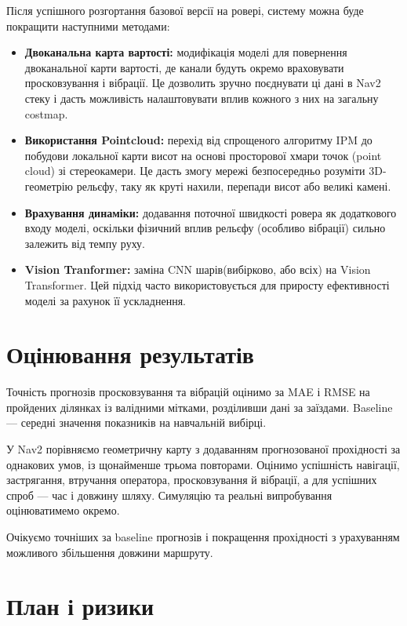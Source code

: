 \documentclass[ukrainian]{ucuproposal}
\begin{document}
Після успішного розгортання базової версії на ровері, систему можна буде покращити наступними методами:
\begin{itemize}
	\item \textbf{Двоканальна карта вартості:} модифікація моделі для повернення двоканальної карти вартості, де канали будуть окремо враховувати просковзування і вібрації. Це дозволить зручно поєднувати ці дані в Nav2 стеку і дасть можливість налаштовувати вплив кожного з них на загальну costmap.
	\item \textbf{Використання Pointcloud:} перехід від спрощеного алгоритму IPM до побудови локальної карти висот на основі просторової хмари точок (point cloud) зі стереокамери. Це дасть змогу мережі безпосередньо розуміти 3D-геометрію рельєфу, таку як круті нахили, перепади висот або великі камені.
	\item \textbf{Врахування динаміки:} додавання поточної швидкості ровера як додаткового входу моделі, оскільки фізичний вплив рельєфу (особливо вібрації) сильно залежить від темпу руху.
	\item \textbf{Vision Tranformer:} заміна CNN шарів(вибірково, або всіх) на Vision Transformer. Цей підхід часто використовується для приросту ефективності моделі за рахунок її ускладнення.

\end{itemize}

\section{Оцінювання результатів}

Точність прогнозів просковзування та вібрацій оцінимо за MAE
і RMSE на пройдених ділянках із валідними мітками, розділивши
дані за заїздами. Baseline --- середні значення показників
на навчальній вибірці.

У Nav2 порівняємо геометричну карту з додаванням прогнозованої
прохідності за однакових умов, із щонайменше трьома повторами.
Оцінимо успішність навігації, застрягання, втручання оператора,
просковзування й вібрації, а для успішних спроб --- час
і довжину шляху. Симуляцію та реальні випробування
оцінюватимемо окремо.

Очікуємо точніших за baseline прогнозів і покращення
прохідності з урахуванням можливого збільшення довжини маршруту.

\section{План і ризики}
\end{document}
